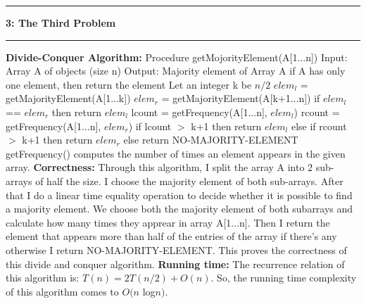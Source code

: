 \documentclass[11pt]{article}
\newcommand\question[2]{\vspace{.25in}\hrule\textbf{#1: #2}\vspace{.5em}\hrule\vspace{.10in}}
\newcommand\correctness{\vspace{.10in}\textbf{Correctness: }}
\newcommand\runtime{\vspace{.10in}\textbf{Running time: }}
\begin{document}
\question{3}{The Third Problem}
\newline \textbf{Divide-Conquer Algorithm: }
\newline Procedure getMojorityElement(A[1...n])
\newline Input: Array A of objects (size n)
\newline Output: Majority element of Array A
\newline if A has only one element, then return the element
\newline Let an integer k be $n/2$
\newline $elem_l$ = getMajorityElement(A[1...k])
\newline $elem_r$ = getMajorityElement(A[k+1...n])
\newline if $elem_l$ == $elem_r$ then return $elem_l$
\newline lcount = getFrequency(A[1...n], $elem_l$)
\newline rcount = getFrequency(A[1...n], $elem_r$)
\newline if lcount $>$ k+1 then return $elem_l$ 
\newline else if rcount $>$ k+1 then return $elem_r$
\newline else return NO-MAJORITY-ELEMENT
\newline 
\newline getFrequency() computes the number of times an element appears in the given array.
\newline
\newline
\correctness{} 
\newline Through this algorithm, I split the array A into 2 sub-arrays of half the size. I choose the majority element of both sub-arrays. After that I do a linear time equality operation to decide whether it is possible to find a majority
element. We choose both the majority element of both subarrays and calculate how many times they apprear in array A[1...n]. Then I return the element that appears more than half of the entries of the array if there's any otherwise I return NO-MAJORITY-ELEMENT. This proves the correctness of this divide and conquer algorithm.
\newline
\newline
\runtime{} The recurrence relation of this algorithm is:  $T(n) = 2T(n/2) + O(n)$. 
\newline So, the running time complexity of this algorithm comes to $O(n$ log$n)$. 
\end{document}
